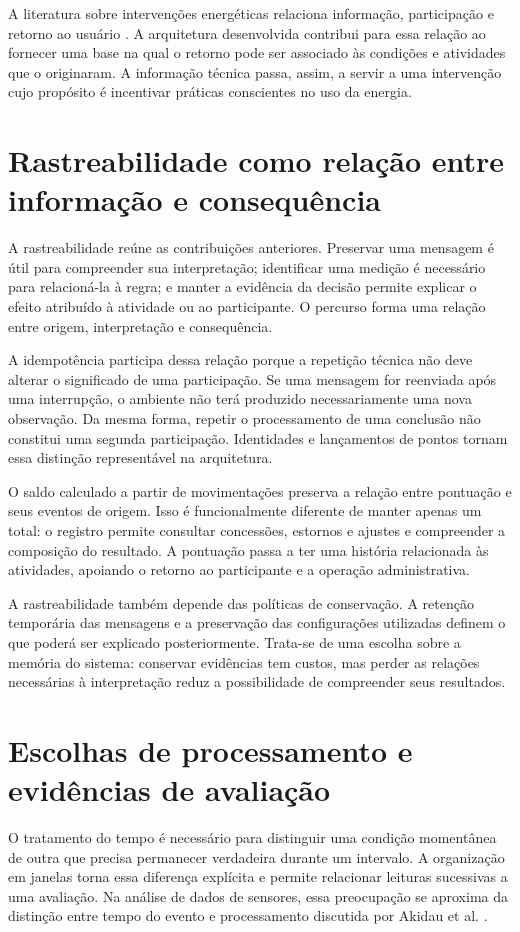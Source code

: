 \documentclass[tcc,capa]{texufpel}
\begin{document}
A literatura sobre intervenções energéticas relaciona informação, participação e retorno ao usuário \cite{orland2014,oppong2020,iria2020}. A arquitetura desenvolvida contribui para essa relação ao fornecer uma base na qual o retorno pode ser associado às condições e atividades que o originaram. A informação técnica passa, assim, a servir a uma intervenção cujo propósito é incentivar práticas conscientes no uso da energia.

\section{Rastreabilidade como relação entre informação e consequência}
A rastreabilidade reúne as contribuições anteriores. Preservar uma mensagem é útil para compreender sua interpretação; identificar uma medição é necessário para relacioná-la à regra; e manter a evidência da decisão permite explicar o efeito atribuído à atividade ou ao participante. O percurso forma uma relação entre origem, interpretação e consequência.

A idempotência participa dessa relação porque a repetição técnica não deve alterar o significado de uma participação. Se uma mensagem for reenviada após uma interrupção, o ambiente não terá produzido necessariamente uma nova observação. Da mesma forma, repetir o processamento de uma conclusão não constitui uma segunda participação. Identidades e lançamentos de pontos tornam essa distinção representável na arquitetura.

O saldo calculado a partir de movimentações preserva a relação entre pontuação e seus eventos de origem. Isso é funcionalmente diferente de manter apenas um total: o registro permite consultar concessões, estornos e ajustes e compreender a composição do resultado. A pontuação passa a ter uma história relacionada às atividades, apoiando o retorno ao participante e a operação administrativa.

A rastreabilidade também depende das políticas de conservação. A retenção temporária das mensagens e a preservação das configurações utilizadas definem o que poderá ser explicado posteriormente. Trata-se de uma escolha sobre a memória do sistema: conservar evidências tem custos, mas perder as relações necessárias à interpretação reduz a possibilidade de compreender seus resultados.

\section{Escolhas de processamento e evidências de avaliação}
O tratamento do tempo é necessário para distinguir uma condição momentânea de outra que precisa permanecer verdadeira durante um intervalo. A organização em janelas torna essa diferença explícita e permite relacionar leituras sucessivas a uma avaliação. Na análise de dados de sensores, essa preocupação se aproxima da distinção entre tempo do evento e processamento discutida por Akidau et al. \cite{akidau2015}.
\end{document}
